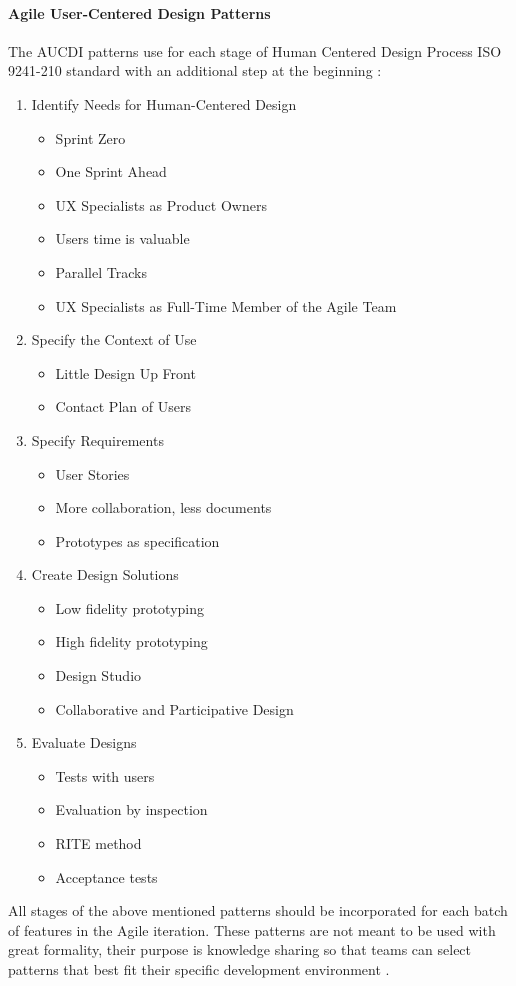 \documentclass{article}
\begin{document}
\paragraph{Agile User-Centered Design Patterns}
The AUCDI patterns use for each stage of Human Centered Design Process ISO 9241-210 standard with an additional step at the beginning \cite{bertholdo2014Agile}\cite{bertholdo2016Agile}:
\begin{enumerate}
 \item Identify Needs for Human-Centered Design
 \begin{itemize}
     \item Sprint Zero
     \item One Sprint Ahead
     \item UX Specialists as Product Owners 
     \item Users time is valuable
     \item Parallel Tracks
     \item UX Specialists as Full-Time Member of the Agile Team
 \end{itemize}
 \item Specify the Context of Use
 \begin{itemize}
     \item Little Design Up Front
     \item Contact Plan of Users
 \end{itemize}
 \item Specify Requirements
 \begin{itemize}
     \item User Stories
     \item More collaboration, less documents
     \item Prototypes as specification
 \end{itemize}
 \item Create Design Solutions
 \begin{itemize}
     \item Low fidelity prototyping
     \item High fidelity prototyping
     \item Design Studio
     \item Collaborative and Participative Design
 \end{itemize}
 \item Evaluate Designs
 \begin{itemize}
     \item Tests with users
     \item Evaluation by inspection
     \item RITE method
     \item Acceptance tests
 \end{itemize}
\end{enumerate}
All stages of the above mentioned patterns should be incorporated for each batch of features in the Agile iteration. These patterns are not meant to be used with great formality, their purpose is knowledge sharing so that teams can select patterns that best fit their specific development environment \cite{bertholdo2016Agile}.
\end{document}
